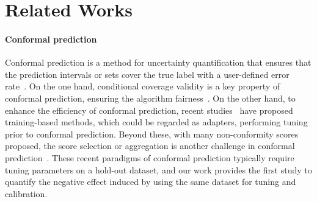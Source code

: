 \documentclass{article}
\newcommand{\1}{\mathbbm{1}}
\theoremstyle{plain}
\theoremstyle{definition}
\theoremstyle{remark}
\begin{document}
\section{Related Works}
\label{sec:related_work}
\paragraph{Conformal prediction}
Conformal prediction is a method for uncertainty quantification that ensures that the prediction intervals or sets cover the true label with a user-defined error rate~\citep{papadopoulos2008inductive, vovk2005algorithmic, vovk2012conditional}. 
On the one hand, conditional coverage validity is a key property of conformal prediction, ensuring the algorithm fairness~\citep{angelopoulos2021uncertainty, gibbs2024conformal, romano2020classification,huang2024conformal}.
On the other hand, to enhance the efficiency of conformal prediction, recent studies~\citep{liu2025cadapter, stutz2022learning, kiyani2024length, kiyani2024conformal} have proposed training-based methods, which could be regarded as adapters, performing tuning prior to conformal prediction.
Beyond these, with many non-conformity scores proposed, the score selection or aggregation is another challenge in conformal prediction~\citep{yang2024selection, luo2024weighted, fan2024utopia, gasparin2024conformal, ge2024optimal, qin2024sat}.
These recent paradigms of conformal prediction typically require tuning parameters on a hold-out dataset, and our work provides the first study to quantify the negative effect induced by using the same dataset for tuning and calibration.
\end{document}
